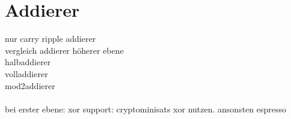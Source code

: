 \section{Addierer}


nur carry ripple addierer\\
vergleich addierer höherer ebene\\
halbaddierer\\
volladdierer\\
mod2addierer\\
~\\
bei erster ebene: xor support: cryptominisats xor nutzen. ansonsten espresso